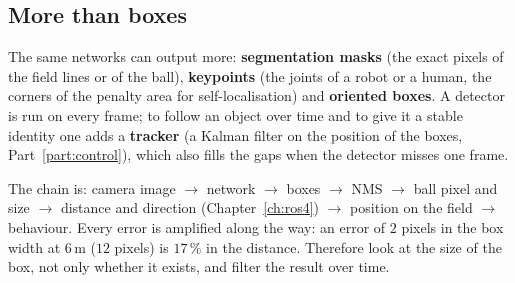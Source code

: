 \subsection*{More than boxes}
The same networks can output more: \textbf{segmentation masks} (the exact pixels of the field lines or of the ball), \textbf{keypoints} (the joints of a robot or a human, the corners of the penalty area for self-localisation) and \textbf{oriented boxes}. A detector is run on every frame; to follow an object over time and to give it a stable identity one adds a \textbf{tracker} (a Kalman filter on the position of the boxes, Part~\ref{part:control}), which also fills the gaps when the detector misses one frame.

\begin{aibox}
The chain is: camera image $\rightarrow$ network $\rightarrow$ boxes $\rightarrow$ NMS $\rightarrow$ ball pixel and size $\rightarrow$ distance and direction (Chapter~\ref{ch:ros4}) $\rightarrow$ position on the field $\rightarrow$ behaviour. Every error is amplified along the way: an error of $2$ pixels in the box width at $6$\,m ($12$ pixels) is $17\,\%$ in the distance. Therefore look at the size of the box, not only whether it exists, and filter the result over time.
\end{aibox}

